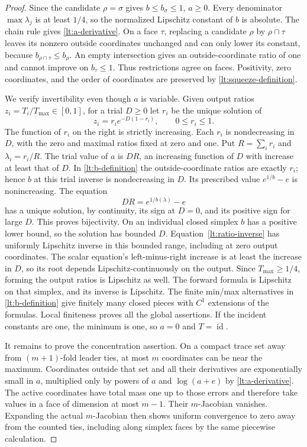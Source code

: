 \documentclass[11pt]{article}
\numberwithin{equation}{section}
\theoremstyle{definition}
\theoremstyle{remark}
\newcommand{\Id}{\operatorname{id}}
\begin{document}
\begin{proof}
Since the candidate $\rho=\sigma$ gives $b\leq b_\sigma\leq1$,
$a\geq0$.  Every denominator $\max\lambda_j$ is at least $1/4$,
so the normalized Lipschitz constant of $b$ is absolute.  The chain
rule gives \eqref{lt:a-derivative}.  On a face $\tau$, replacing a
candidate $\rho$ by $\rho\cap\tau$ leaves its nonzero outside
coordinates unchanged and can only lower its constant, because
$b_{\rho\cap\tau}\leq b_\rho$.  An empty intersection gives an
outside-coordinate ratio of one and cannot improve on $b_\tau\leq1$.
Thus restrictions agree on faces.  Positivity, zero coordinates, and
the order of coordinates are preserved by \eqref{lt:squeeze-definition}.

We verify invertibility even though $a$ is variable.  Given output
ratios $z_i=T_i/T_{\max}\in[0,1]$, for a trial $D\geq0$ let $r_i$
be the unique solution of
\begin{equation}
 z_i=r_i e^{-D(1-r_i)},\qquad 0\leq r_i\leq1.
 \label{lt:ratio-inverse}
\end{equation}
The function of $r_i$ on the right is strictly increasing.  Each
$r_i$ is nondecreasing in $D$, with the zero and maximal ratios fixed
at zero and one.  Put $R=\sum_i r_i$ and $\lambda_i=r_i/R$.
The trial value of $a$ is $DR$, an increasing function of $D$ with
increase at least that of $D$.  In \eqref{lt:b-definition} the
outside-coordinate ratios are exactly $r_i$; hence $b$ at this trial
inverse is nondecreasing in $D$.  Its prescribed value
$e^{1/b}-e$ is nonincreasing.  The equation
\[
 DR=e^{1/b(\lambda)}-e
\]
has a unique solution, by continuity, its sign at $D=0$, and its
positive sign for large $D$.  This proves bijectivity.
On an individual closed simplex $b$ has a positive lower bound, so
the solution has bounded $D$.  Equation~\eqref{lt:ratio-inverse}
has uniformly Lipschitz inverse in this bounded range, including at
zero output coordinates.  The scalar equation's left-minus-right
increase is at least the increase in $D$, so its root depends
Lipschitz-continuously on the output.  Since $T_{\max}\geq1/4$,
forming the output ratios is Lipschitz as well.  The forward formula
is Lipschitz on that simplex, and its inverse is Lipschitz.  The
finite min/max alternatives in \eqref{lt:b-definition} give finitely
many closed pieces with $C^1$ extensions of the formulas.  Local
finiteness proves all the global assertions.  If the incident
constants are one, the minimum is one, so $a=0$ and $T=\Id$.

It remains to prove the concentration assertion.  On a compact trace
set away from $(m+1)$-fold leader ties, at most $m$ coordinates can be
near the maximum.  Coordinates outside that set and all their
derivatives are exponentially small in $a$, multiplied only by
powers of $a$ and $\log(a+e)$ by \eqref{lt:a-derivative}.  The active
coordinates have total mass one up to those errors and therefore
take values in a face of dimension at most $m-1$.  Their $m$-Jacobian
vanishes.  Expanding the actual $m$-Jacobian then shows uniform
convergence to zero away from the counted ties, including along
simplex faces by the same piecewise calculation.


\end{proof}
\end{document}
